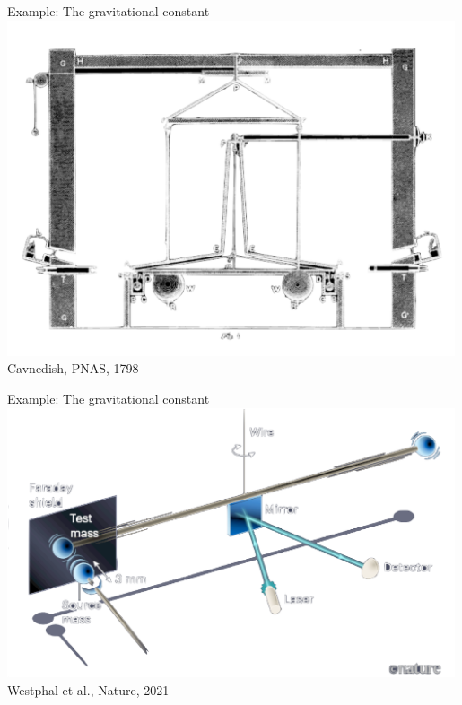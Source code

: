     \begin{frame}
        \begin{PointSix}{Example: The gravitational constant}
            \includegraphics[width=0.99\textwidth]{Figures/Gravity/Exported/Cavendish_PNAS1798.png}
            \centering
            \tiny Cavnedish, PNAS, 1798
        \end{PointSix}
    \end{frame}
    \begin{frame}
        \begin{PointSix}{Example: The gravitational constant}
            \includegraphics[width=0.99\textwidth]{Figures/Gravity/Exported/MeasuringG_Westphal_Nature2021.png}
            \centering
            \tiny Westphal et al., Nature, 2021
        \end{PointSix}
    \end{frame}   

